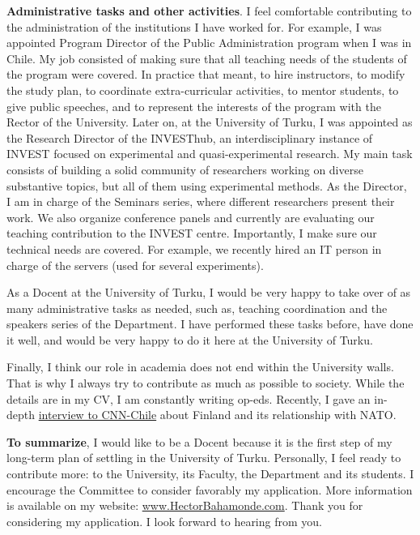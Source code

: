 \documentclass[10pt,stdletter,dateno,sigleft]{newlfm} %
\begin{document}
\begin{newlfm}
{\bf Administrative tasks and other activities}. I feel comfortable contributing to the administration of the institutions I have worked for. For example, I was appointed Program Director of the Public Administration program when I was in Chile. My job consisted of making sure that all teaching needs of the students of the program were covered. In practice that meant, to hire instructors, to modify the study plan, to coordinate extra-curricular activities, to mentor students, to give public speeches, and to represent the interests of the program with the Rector of the University. Later on, at the University of Turku, I was appointed as the Research Director of the INVESThub, an interdisciplinary instance of INVEST focused on experimental and quasi-experimental research. My main task consists of building a solid community of researchers working on diverse substantive topics, but all of them using experimental methods. As the Director, I am in charge of the Seminars series, where different researchers present their work. We also organize conference panels and currently are evaluating our teaching contribution to the INVEST centre. Importantly, I make sure our technical needs are covered. For example, we recently hired an IT person in charge of the servers (used for several experiments).

As a Docent at the University of Turku, I would be very happy to take over of as many administrative tasks as needed, such as, teaching coordination and the speakers series of the Department. I have performed these tasks before, have done it well, and would be very happy to do it here at the University of Turku.

Finally, I think our role in academia does not end within the University walls. That is why I always try to contribute as much as possible to society. While the details are in my CV, I am constantly writing op-eds. Recently, I gave an in-depth \href{https://twitter.com/CNNChile/status/1527122195780186112?s=20&t=-tO34V0-IHexWmRUePwHJ/}{interview to CNN-Chile} about Finland and its relationship with NATO. 

{\bf To summarize}, I would like to be a Docent because it is the first step of my long-term plan of settling in the University of Turku. Personally, I feel ready to contribute more: to the University, its Faculty, the Department and its students. I encourage the Committee to consider favorably my application. More information is available on my website: \href{http://www.hectorbahamonde.com}{www.HectorBahamonde.com}. Thank you for considering my application. I look forward to hearing from you.



\newpage
\printbibliography



\end{newlfm}
\end{document}
